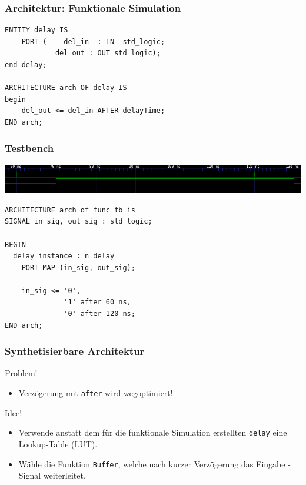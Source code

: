 \documentclass{beamer}
\begin{document}
\begin{frame}[fragile]
        \frametitle{Architektur: Funktionale Simulation}
        \begin{lstlisting}[style=vhdl]
ENTITY delay IS
    PORT (    del_in  : IN  std_logic;
            del_out : OUT std_logic);
end delay;

ARCHITECTURE arch OF delay IS
begin
    del_out <= del_in AFTER delayTime;
END arch;
    \end{lstlisting}
\end{frame}




\begin{frame}[fragile]
        \frametitle{Testbench}
        \includegraphics[width=\textwidth]{n_delay_func_sim1.png}
        \begin{lstlisting}[style=vhdl]
ARCHITECTURE arch of func_tb is 
SIGNAL in_sig, out_sig : std_logic;

BEGIN
  delay_instance : n_delay
    PORT MAP (in_sig, out_sig);

    in_sig <= '0',
              '1' after 60 ns,
              '0' after 120 ns;
END arch;
        \end{lstlisting}
\end{frame}


\begin{frame}[fragile]
    \frametitle{Synthetisierbare Architektur}
    Problem!
    \begin{itemize}
        \item Verzögerung mit \texttt{after} wird wegoptimiert!
    \end{itemize}
    Idee!
    \begin{itemize}
        \item Verwende anstatt dem für die funktionale Simulation erstellten \texttt{delay} eine Lookup-Table (LUT).
        \item Wähle die Funktion \texttt{Buffer}, welche nach kurzer Verzögerung das Eingabe - Signal weiterleitet.
    \end{itemize}
\end{frame}
\end{document}
